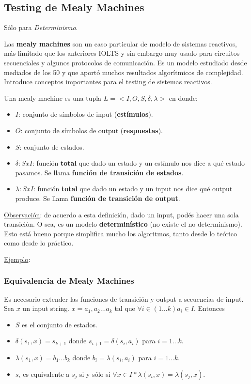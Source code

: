 \documentclass[]{article}
\begin{document}
\subsection{Testing de Mealy Machines}
Sólo para \emph{Determinismo}.

Las \textbf{mealy machines} son un caso particular de modelo de sistemas reactivos, más limitado que los anteriores IOLTS y sin embargo muy usado para circuitos secuenciales y algunos protocolos de comunicación. Es un modelo estudiado desde mediados de los 50 y que aportó muchos resultados algorítmicos de complejidad. Introduce conceptos importantes para el testing de sistemas reactivos.

Una mealy machine es una tupla $L=<I,O,S,\delta,\lambda>$ en donde:
\begin{itemize}
	\item $I$: conjunto de símbolos de input (\textbf{estímulos}).
	\item $O$: conjunto de símbolos de output (\textbf{respuestas}).
	\item $S$: conjunto de estados.
	\item $\delta: SxI$: función \textbf{total} que dado un estado y un estímulo nos dice a qué estado pasamos. Se llama \textbf{función de transición de estados}.
	\item $\lambda: SxI$: función \textbf{total} que dado un estado y un input nos dice qué output produce. Se llama \textbf{función de transición de output}.
\end{itemize}

\underline{Observación}: de acuerdo a esta definición, dado un input, podés hacer una sola transición. O sea, es un modelo \textbf{determinístico} (no existe el no determinismo). Esto está bueno porque simplifica mucho los algoritmos, tanto desde lo teórico como desde lo práctico.

\underline{Ejemplo}:

\subsubsection{Equivalencia de Mealy Machines}
Es necesario extender las funciones de transición y output a secuencias de input. Sea $x$ un input string. $x=a_1,a_2\hdots a_k$ tal que $\forall i\in(1 \hdots k) a_i\in I$. Entonces
\begin{itemize}
	\item $S$ es el conjunto de estados.
	\item $\delta(s_1,x)=s_{k+1}$ donde $s_{i+1} = \delta(s_i,a_i)$ para $i=1\hdots k$.
	\item $\lambda(s_1,x) = b_1\hdots b_k$ donde $b_i = \lambda(s_i,a_i)$ para $i=1\hdots k$.
	\item $s_i$ es equivalente a $s_j$ si y sólo si $\forall x\in I* \lambda(s_i,x)=\lambda(s_j,x)$.
\end{itemize}
\end{document}
